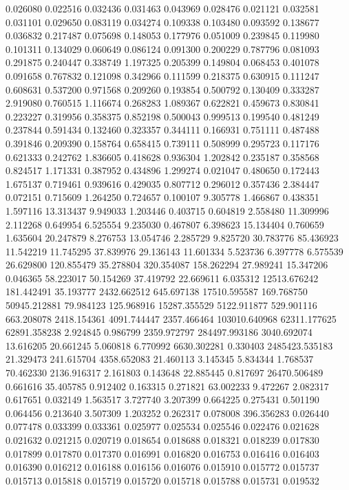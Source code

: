 0.026080
0.022516
0.032436
0.031463
0.043969
0.028476
0.021121
0.032581
0.031101
0.029650
0.083119
0.034274
0.109338
0.103480
0.093592
0.138677
0.036832
0.217487
0.075698
0.148053
0.177976
0.051009
0.239845
0.119980
0.101311
0.134029
0.060649
0.086124
0.091300
0.200229
0.787796
0.081093
0.291875
0.240447
0.338749
1.197325
0.205399
0.149804
0.068453
0.401078
0.091658
0.767832
0.121098
0.342966
0.111599
0.218375
0.630915
0.111247
0.608631
0.537200
0.971568
0.209260
0.193854
0.500792
0.130409
0.333287
2.919080
0.760515
1.116674
0.268283
1.089367
0.622821
0.459673
0.830841
0.223227
0.319956
0.358375
0.852198
0.500043
0.999513
0.199540
0.481249
0.237844
0.591434
0.132460
0.323357
0.344111
0.166931
0.751111
0.487488
0.391846
0.209390
0.158764
0.658415
0.739111
0.508999
0.295723
0.117176
0.621333
0.242762
1.836605
0.418628
0.936304
1.202842
0.235187
0.358568
0.824517
1.171331
0.387952
0.434896
1.299274
0.021047
0.480650
0.172443
1.675137
0.719461
0.939616
0.429035
0.807712
0.296012
0.357436
2.384447
0.072151
0.715609
1.264250
0.724657
0.100107
9.305778
1.466867
0.438351
1.597116
13.313437
9.949033
1.203446
0.403715
0.604819
2.558480
11.309996
2.112268
0.649954
6.525554
9.235030
0.467807
6.398623
15.134404
0.760659
1.635604
20.247879
8.276753
13.054746
2.285729
9.825720
30.783776
85.436923
11.542219
11.745295
37.839976
29.136143
11.601334
5.523736
6.397778
6.575539
26.629800
120.855479
35.278804
320.354087
158.262294
27.989241
15.347206
0.046365
58.223017
50.154269
37.419792
22.669611
6.035312
12513.676242
181.442491
35.193777
2432.662512
645.697138
17510.595587
169.768750
50945.212881
79.984123
125.968916
15287.355529
5122.911877
529.901116
663.208078
2418.154361
4091.744447
2357.466464
103010.640968
62311.177625
62891.358238
2.924845
0.986799
2359.972797
284497.993186
3040.692074
13.616205
20.661245
5.060818
6.770992
6630.302281
0.330403
2485423.535183
21.329473
241.615704
4358.652083
21.460113
3.145345
5.834344
1.768537
70.462330
2136.916317
2.161803
0.143648
22.885445
0.817697
26470.506489
0.661616
35.405785
0.912402
0.163315
0.271821
63.002233
9.472267
2.082317
0.617651
0.032149
1.563517
3.727740
3.207399
0.664225
0.275431
0.501190
0.064456
0.213640
3.507309
1.203252
0.262317
0.078008
396.356283
0.026440
0.077478
0.033399
0.033361
0.025977
0.025534
0.025546
0.022476
0.021628
0.021632
0.021215
0.020719
0.018654
0.018688
0.018321
0.018239
0.017830
0.017899
0.017870
0.017370
0.016991
0.016820
0.016753
0.016416
0.016403
0.016390
0.016212
0.016188
0.016156
0.016076
0.015910
0.015772
0.015737
0.015713
0.015818
0.015719
0.015720
0.015718
0.015788
0.015731
0.019532
